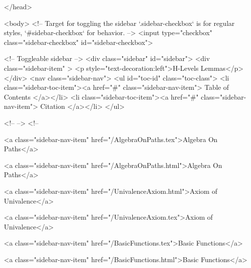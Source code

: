   
</head>




  <body>
    <!-- Target for toggling the sidebar `.sidebar-checkbox` is for regular
     styles, `#sidebar-checkbox` for behavior. -->
<input type="checkbox" class="sidebar-checkbox" id="sidebar-checkbox">

<!-- Toggleable sidebar -->
<div class="sidebar" id="sidebar">
  <div class="sidebar-item" >
    <p style="text-decoration:left">H-Levels Lemmas</p>
  </div>
  <nav class="sidebar-nav">
    <ul id="toc-id" class="toc-class">
  <li class="sidebar-toc-item"><a href="#" class="sidebar-nav-item"> Table of Contents </a></li>
  <li class="sidebar-toc-item"><a href="#" class="sidebar-nav-item"> Citation </a></li>
</ul>


    <!--  -->
    <!-- 
      
    
      
    
      
    
      
        
      
    
      
        
          <a class="sidebar-nav-item" href="/AlgebraOnPaths.tex">Algebra On Paths</a>
        
      
    
      
        
          <a class="sidebar-nav-item" href="/AlgebraOnPaths.html">Algebra On Paths</a>
        
      
    
      
        
          <a class="sidebar-nav-item" href="/UnivalenceAxiom.html">Axiom of Univalence</a>
        
      
    
      
        
          <a class="sidebar-nav-item" href="/UnivalenceAxiom.tex">Axiom of Univalence</a>
        
      
    
      
        
          <a class="sidebar-nav-item" href="/BasicFunctions.tex">Basic Functions</a>
        
      
    
      
        
          <a class="sidebar-nav-item" href="/BasicFunctions.html">Basic Functions</a>
        
      
    
      
        
